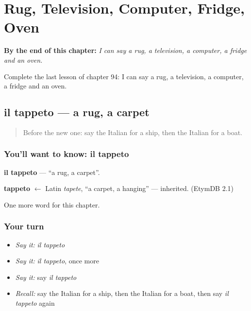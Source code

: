 
\chapter{Rug, Television, Computer, Fridge, Oven}
\label{ch:it-rug-television-computer-fridge-oven}

\begin{chapteropening}
\textbf{By the end of this chapter:} \emph{I can say a rug, a television, a computer, a fridge and an oven.}

Complete the last lesson of chapter 94: I can say a rug, a television, a computer, a fridge and an oven.
\end{chapteropening}

\section[il tappeto]{il tappeto — a rug, a carpet}

\label{lesson:IT-C94-tappeto}



\begin{quote}
Before the new one: say the Italian for a ship, then the Italian for a boat.
\end{quote}

\subsection*{You'll want to know: il tappeto}
\textbf{il tappeto} — \textquotedblleft{}a rug, a carpet\textquotedblright{}.

\begin{cousinweb}
\textbf{tappeto} $\leftarrow$ Latin \emph{tapete}, \textquotedblleft{}a carpet, a hanging\textquotedblright{} — inherited. (EtymDB 2.1)
\end{cousinweb}

\begin{grammarlens}[title={What you've built}]
One more word for this chapter.
\end{grammarlens}

\subsection*{Your turn}
\begin{itemize}
\raggedright
  \item \emph{Say it:} \emph{il tappeto}
  \item \emph{Say it:} \emph{il tappeto}, once more
  \item \emph{Say it:} say \emph{il tappeto}
  \item \emph{Recall:} say the Italian for a ship, then the Italian for a boat, then say \emph{il tappeto} again
\end{itemize}

